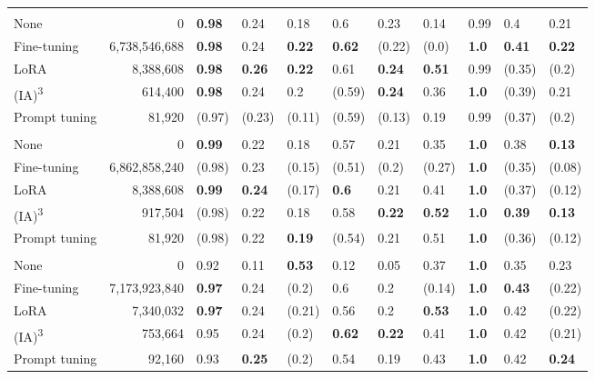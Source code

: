 \documentclass[12pt]{book}
\begin{document}
\begin{ThreePartTable}
\begin{xltabular}{\textwidth}{lr!{\color{white}\hspace{.5em}}YYYYYY!{\color{white}\hspace{1em}}YYY}
         \bigstrut \\*
        None & 0 & \textbf{0.98} & 0.24 & 0.18 & 0.6 & 0.23 & 0.14 & 0.99 & 0.4 & 0.21 \\*
        Fine-tuning & 6,738,546,688 & \textbf{0.98} & 0.24 & \textbf{0.22} & \textbf{0.62} & (0.22) & (0.0) & \textbf{1.0} & \textbf{0.41} & \textbf{0.22} \\*
        LoRA & 8,388,608 & \textbf{0.98} & \textbf{0.26} & \textbf{0.22} & 0.61 & \textbf{0.24} & \textbf{0.51} & 0.99 & (0.35) & (0.2) \\*
        (IA)\textsuperscript{3} & 614,400 & \textbf{0.98} & 0.24 & 0.2 & (0.59) & \textbf{0.24} & 0.36 & \textbf{1.0} & (0.39) & 0.21 \\*
        Prompt tuning & 81,920 & (0.97) & (0.23) & (0.11) & (0.59) & (0.13) & 0.19 & 0.99 & (0.37) & (0.2) \\

         \bigstrut \\*
        None & 0 & \textbf{0.99} & 0.22 & 0.18 & 0.57 & 0.21 & 0.35 & \textbf{1.0} & 0.38 & \textbf{0.13} \\*
        Fine-tuning & 6,862,858,240 & (0.98) & 0.23 & (0.15) & (0.51) & (0.2) & (0.27) & \textbf{1.0} & (0.35) & (0.08) \\*
        LoRA & 8,388,608 & \textbf{0.99} & \textbf{0.24} & (0.17) & \textbf{0.6} & 0.21 & 0.41 & \textbf{1.0} & (0.37) & (0.12) \\*
        (IA)\textsuperscript{3} & 917,504 & (0.98) & 0.22 & 0.18 & 0.58 & \textbf{0.22} & \textbf{0.52} & \textbf{1.0} & \textbf{0.39} & \textbf{0.13} \\*
        Prompt tuning & 81,920 & (0.98) & 0.22 & \textbf{0.19} & (0.54) & 0.21 & 0.51 & \textbf{1.0} & (0.36) & (0.12) \\

         \bigstrut \\*
        None & 0 & 0.92 & 0.11 & \textbf{0.53} & 0.12 & 0.05 & 0.37 & \textbf{1.0} & 0.35 & 0.23 \\*
        Fine-tuning & 7,173,923,840 & \textbf{0.97} & 0.24 & (0.2) & 0.6 & 0.2 & (0.14) & \textbf{1.0} & \textbf{0.43} & (0.22) \\*
        LoRA & 7,340,032 & \textbf{0.97} & 0.24 & (0.21) & 0.56 & 0.2 & \textbf{0.53} & \textbf{1.0} & 0.42 & (0.22) \\*
        (IA)\textsuperscript{3} & 753,664 & 0.95 & 0.24 & (0.2) & \textbf{0.62} & \textbf{0.22} & 0.41 & \textbf{1.0} & 0.42 & (0.21) \\*
        Prompt tuning & 92,160 & 0.93 & \textbf{0.25} & (0.2) & 0.54 & 0.19 & 0.43 & \textbf{1.0} & 0.42 & \textbf{0.24} \\


\end{xltabular}
\end{ThreePartTable}
\end{document}
